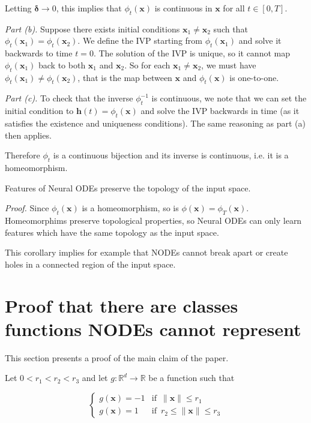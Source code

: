 \documentclass{article}
\begin{document}
Letting $\mathbf{\delta} \to 0$, this implies that $\phi_t(\mathbf{x})$ is continuous in $\mathbf{x}$ for all $t \in [0, T]$.

\textit{Part (b).} Suppose there exists initial conditions $\mathbf{x}_1 \neq \mathbf{x}_2$ such that $\phi_t(\mathbf{x}_1)=\phi_t(\mathbf{x}_2)$. We define the IVP starting from $\phi_t(\mathbf{x}_1)$ and solve it backwards to time $t=0$. The solution of the IVP is unique, so it cannot map $\phi_t(\mathbf{x}_1)$ back to both $\mathbf{x}_1$ and $\mathbf{x}_2$. So for each $\mathbf{x}_1 \neq \mathbf{x}_2$, we must have $\phi_t(\mathbf{x}_1) \neq \phi_t(\mathbf{x}_2)$, that is the map between $\mathbf{x}$ and $\phi_t(\mathbf{x})$ is one-to-one.

\textit{Part (c).} To check that the inverse $\phi_t^{-1}$ is continuous, we note that we can set the initial condition to $\mathbf{h}(t) = \phi_t(\mathbf{x})$ and solve the IVP backwards in time (as it satisfies the existence and uniqueness conditions). The same reasoning as part (a) then applies.

Therefore $\phi_t$ is a continuous bijection and its inverse is continuous, i.e. it is a homeomorphism. 

\begin{corollary*}
Features of Neural ODEs preserve the topology of the input space.
\end{corollary*}

\textit{Proof.} Since $\phi_t(\mathbf{x})$ is a homeomorphism, so is $\phi(\mathbf{x})=\phi_T(\mathbf{x})$. Homeomorphims preserve topological properties, so Neural ODEs can only learn features which have the same topology as the input space.

This corollary implies for example that NODEs cannot break apart or create holes in a connected region of the input space.

\section{Proof that there are classes functions NODEs cannot represent} \label{proof-nd-example}

This section presents a proof of the main claim of the paper.

Let $0 < r_1 < r_2 < r_3$ and let $g : \mathbb{R}^d \to \mathbb{R}$ be a function such that

\[
  \begin{cases}
       g(\mathbf{x}) = -1 & \text{if $\,\|\mathbf{x}\| \leq r_1$} \\
       g(\mathbf{x}) = 1 & \text{if $\,r_2 \leq \|\mathbf{x}\| \leq r_3$} 
  \end{cases}
\]
\end{document}
